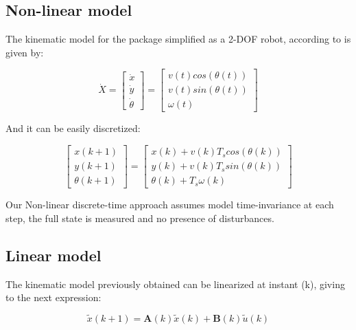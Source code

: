\documentclass[conference]{IEEEtran}
\begin{document}
\subsection{Non-linear model}\label{AA}

The kinematic model for the package simplified as a 2-DOF robot, according to \cite{campion1996structural} is given by:

\begin{equation} \label{eq:1}
\dot{X} =  \left[\begin{array}{c}
\dot{x} \\ \dot{y} \\ \dot{\theta} \end{array}\right]
 = \left[\begin{array}{c}
v(t)cos(\theta(t)) \\ v(t)sin(\theta(t)) \\ \omega(t) \end{array}\right]
\end{equation}

And it can be easily discretized:

\begin{equation} \label{eq:2}
\left[\begin{array}{c}
x(k+1) \\ y(k+1) \\ \theta(k+1) \end{array}\right]
 = \left[\begin{array}{c}
x(k)+v(k)T_{s}cos(\theta(k)) \\ y(k)+v(k)T_{s}sin(\theta(k)) \\ \theta(k)+T_{s}\omega(k) \end{array}\right]
\end{equation}

Our Non-linear discrete-time approach assumes model time-invariance at each step, the full state is measured and no presence of disturbances.

\subsection{Linear model}\label{AB}

The kinematic model previously obtained can be linearized at instant (k), giving to the next expression:

\begin{equation} \label{eq:3}
\tilde{x}(k+1)=\mathbf{A}(k)\tilde{x}(k)+\mathbf{B}(k)\tilde{u}(k)
\end{equation}
\end{document}
